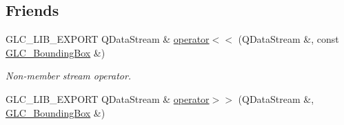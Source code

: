 \subsection*{Friends}
\begin{DoxyCompactItemize}
\item 
G\-L\-C\-\_\-\-L\-I\-B\-\_\-\-E\-X\-P\-O\-R\-T Q\-Data\-Stream \& \hyperlink{class_g_l_c___bounding_box_ace1bd667b296ea66f00196ee6d665f79}{operator$<$$<$} (Q\-Data\-Stream \&, const \hyperlink{class_g_l_c___bounding_box}{G\-L\-C\-\_\-\-Bounding\-Box} \&)
\begin{DoxyCompactList}\small\item\em Non-\/member stream operator. \end{DoxyCompactList}\item 
G\-L\-C\-\_\-\-L\-I\-B\-\_\-\-E\-X\-P\-O\-R\-T Q\-Data\-Stream \& \hyperlink{class_g_l_c___bounding_box_ac6333964c338b805eb395f9c6bda6d21}{operator$>$$>$} (Q\-Data\-Stream \&, \hyperlink{class_g_l_c___bounding_box}{G\-L\-C\-\_\-\-Bounding\-Box} \&)
\end{DoxyCompactItemize}
